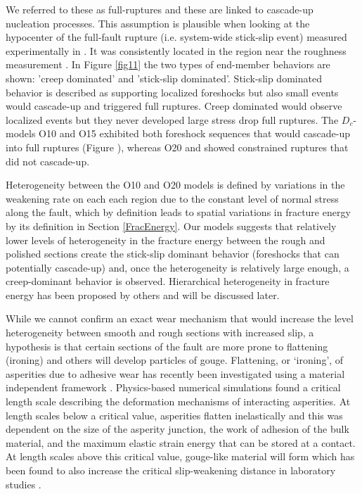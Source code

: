 \documentclass[preprint,1p, 10pt,authoryear]{elsarticle}
\begin{document}
We referred to these as full-ruptures and these are linked to cascade-up nucleation processes. This assumption is plausible when looking at the hypocenter of the full-fault rupture (i.e. system-wide stick-slip event) measured experimentally in \citet{Selvadurai2015}. It was consistently located in the region near the roughness measurement \citep[magenta star in fig. 7 and 8 ,][]{Selvadurai2015}. In Figure \ref{fig11} the two types of end-member behaviors are shown: 'creep dominated' and 'stick-slip dominated'. Stick-slip dominated behavior is described as supporting localized foreshocks but also small events would cascade-up and triggered full ruptures. Creep dominated would observe localized events but they never developed large stress drop full ruptures. The $D_{c}$-models O10 and O15 exhibited both foreshock sequences that would cascade-up into full ruptures (Figure ), whereas O20 and showed constrained ruptures that did not cascade-up. 

Heterogeneity between the O10 and O20 models is defined by variations in the weakening rate on each each region due to the constant level of normal stress along the fault, which by definition leads to spatial variations in fracture energy by its definition in Section \ref{FracEnergy}. Our models suggests that relatively lower levels of heterogeneity in the fracture energy between the rough and polished sections create the stick-slip dominant behavior (foreshocks that can potentially cascade-up) and, once the heterogeneity is relatively large enough, a creep-dominant behavior is observed. Hierarchical heterogeneity in fracture energy has been proposed by others \citep{Ide2005, Aochi2014, Aochi2017} and will be discussed later.

While we cannot confirm an exact wear mechanism that would increase the level heterogeneity between smooth and rough sections with increased slip, a hypothesis is that certain sections of the fault are more prone to flattening (ironing) and others will develop particles of gouge. Flattening, or ‘ironing’, of asperities due to adhesive wear has recently been investigated using a material independent framework \citet{Aghababaei2016}. Physics-based numerical simulations found a critical length scale describing the deformation mechanisms of interacting asperities. At length scales below a critical value, asperities flatten inelastically and this was dependent on the size of the asperity junction, the work of adhesion of the bulk material, and the maximum elastic strain energy that can be stored at a contact. At length scales above this critical value, gouge-like material will form which has been found to also increase the critical slip-weakening distance in laboratory studies \citep{Dieterich1981,Marone1998,Anthony2005}.   
\end{document}
